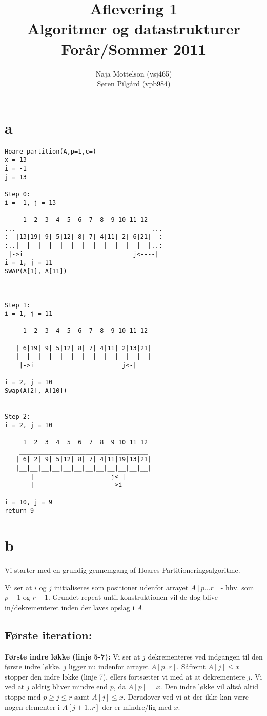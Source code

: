 \documentclass[10pt,a4paper,danish]{article}
\title{Aflevering 1 \\Algoritmer og datastrukturer\\Forår/Sommer 2011}
\author{Naja Mottelson (vsj465)\\Søren Pilgård (vpb984)}
\begin{document}
\maketitle
\newpage

\tableofcontents
\newpage

\section{a}
\begin{verbatim}
Hoare-partition(A,p=1,c=)
x = 13
i = -1
j = 13

Step 0:
i = -1, j = 13

     1  2  3  4  5  6  7  8  9 10 11 12
... ___________________________________ ...
:  |13|19| 9| 5|12| 8| 7| 4|11| 2| 6|21|  :
:..|__|__|__|__|__|__|__|__|__|__|__|__|..:
 |->i                              j<----|
i = 1, j = 11
SWAP(A[1], A[11])



Step 1:
i = 1, j = 11

     1  2  3  4  5  6  7  8  9 10 11 12
    ___________________________________ 
   | 6|19| 9| 5|12| 8| 7| 4|11| 2|13|21|
   |__|__|__|__|__|__|__|__|__|__|__|__|
    |->i                        j<-|

i = 2, j = 10
Swap(A[2], A[10])


Step 2:
i = 2, j = 10

     1  2  3  4  5  6  7  8  9 10 11 12
    ___________________________________ 
   | 6| 2| 9| 5|12| 8| 7| 4|11|19|13|21|
   |__|__|__|__|__|__|__|__|__|__|__|__|
       |                     j<-|
       |---------------------->i

i = 10, j = 9
return 9

\end{verbatim}
\section{b}
Vi starter med en grundig gennemgang af Hoares Partitioneringsalgoritme.

Vi ser at $i$ og $j$ initialiseres som positioner udenfor arrayet $A[p \ldots r]$ - hhv. som $p-1$ og $r+1$.
Grundet repeat-until konstruktionen vil de dog blive in/dekrementeret inden der laves opslag i $A$.

\subsection{Første iteration:}
\label{sec:foerste-it}
\textbf{Første indre løkke (linje 5-7):}
Vi ser at $j$ dekrementeres ved indgangen til den første indre løkke. $j$ ligger nu indenfor arrayet $A[p..r]$. 
Såfremt $A[j] \leq x$ stopper den indre løkke (linje 7), ellers fortsætter vi med at at dekrementere $j$.
Vi ved at $j$ aldrig bliver mindre end $p$, da $A[p] = x$. Den indre løkke vil altså altid stoppe med $p \geq j \leq r$ samt $A[j] \leq x$.
Derudover ved vi at der ikke kan være nogen elementer i $A[j+1..r]$ der er mindre/lig med $x$.
 
\end{document}
